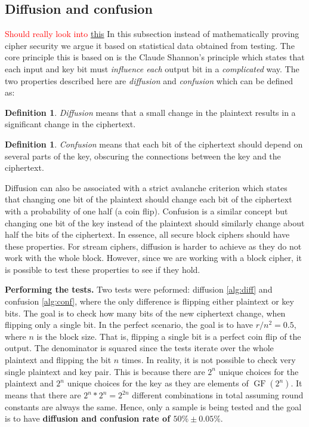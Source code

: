 \documentclass{Resources/UoBLab1}
\theoremstyle{definition}
\newtheorem{definition}[theorem]{Definition}
\begin{document}
\subsection{Diffusion and confusion}
\textcolor{red}{Should really look into \href{https://eprint.iacr.org/2010/564.pdf}{this}}
In this subsection instead of mathematically proving cipher security we argue it based on statistical data obtained from testing. The core principle this is based on is the Claude Shannon's principle which states that each input and key bit must \textit{influence each} output bit in a \textit{complicated} way\cite{OneTime}. The two properties described here are \textit{diffusion} and \textit{confusion} which can be defined as:
\begin{definition}
    \textit{Diffusion} means that a small change in the plaintext results in a significant change in the ciphertext.
\end{definition}
\begin{definition}
    \textit{Confusion} means that each bit of the ciphertext should depend on several parts of the key, obscuring the connections between the key and the ciphertext.
\end{definition}
Diffusion can also be associated with a strict avalanche criterion which states that changing one bit of the plaintext should change each bit of the ciphertext with a probability of one half (a coin flip). Confusion is a similar concept but changing one bit of the key instead of the plaintext should similarly change about half the bits of the ciphertext. In essence, all secure block ciphers should have these properties. For stream ciphers, diffusion is harder to achieve as they do not work with the whole block. However, since we are working with a block cipher, it is possible to test these properties to see if they hold.\medskip

\noindent\textbf{Performing the tests.} Two tests were peformed: diffusion \ref{alg:diff} and confusion \ref{alg:conf}, where the only difference is flipping either plaintext or key bits. The goal is to check how many bits of the new ciphertext change, when flipping only a single bit. In the perfect scenario, the goal is to have \(r / n^2 = 0.5\), where $n$ is the block size. That is, flipping a single bit is a perfect coin flip of the output. The denominator is squared since the tests iterate over the whole plaintext and flipping the bit $n$ times. In reality, it is not possible to check very single plaintext and key pair. This is because there are $2^n$ unique choices for the plaintext and $2^n$ unique choices for the key as they are elements of $\operatorname{GF}(2^n)$. It means that there are \(2^n*2^n = 2^{2n}\) different combinations in total assuming round constants are always the same. Hence, only a sample is being tested and the goal is to have \textbf{diffusion and confusion rate of $ 50\% \pm 0.05\%$}.
\end{document}
